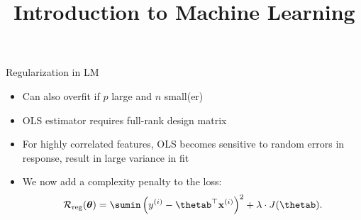 \documentclass[11pt,compress,t,notes=noshow, xcolor=table]{beamer}
\title{Introduction to Machine Learning}
\begin{document}



\begin{vbframe}{Regularization in LM}

  \begin{itemize} \setlength{\itemsep}{1.3em}
  \item Can also overfit if $p$ large and $n$ small(er)
  \item OLS estimator requires full-rank design matrix
  \item For highly correlated features, OLS becomes sensitive to random errors in response, result in large variance in fit
  \item We now add a complexity penalty to the loss:
  $$
  \riskrt = \sumin \left(\yi - \thetab^\top \xi \right)^2 + \lambda \cdot J(\thetab). 
  $$ 
  \end{itemize}

\end{vbframe}






\end{document}
